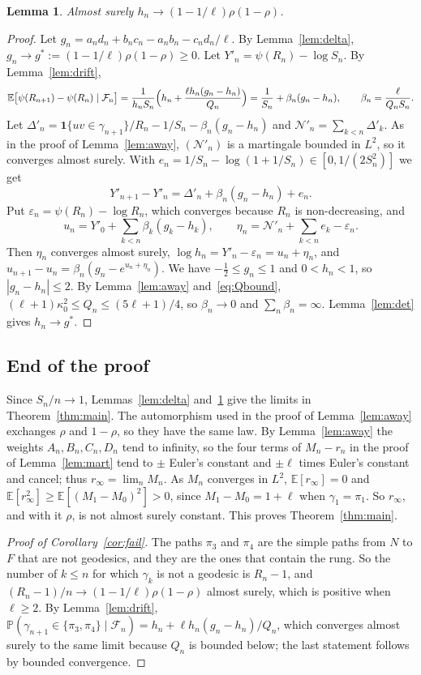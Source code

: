 \documentclass[11pt]{amsart}
\newtheorem{lemma}[theorem]{Lemma}
\theoremstyle{remark}
\newcommand{\PP}{\mathbb{P}}
\newcommand{\EE}{\mathbb{E}}
\newcommand{\cF}{\mathcal{F}}
\newcommand{\one}{\mathbf{1}}
\begin{document}
\begin{lemma}\label{lem:rung}
Almost surely $h_n\to(1-1/\ell)\rho(1-\rho)$.
\end{lemma}
\begin{proof}
Let $g_n=a_nd_n+b_nc_n-a_nb_n-c_nd_n/\ell$. By Lemma~\ref{lem:delta}, $g_n\to g^*:=(1-1/\ell)\rho(1-\rho)\ge0$.
Let $Y'_n=\psi(R_n)-\log S_n$. By Lemma~\ref{lem:drift},
\[
\EE\bigl[\psi(R_{n+1})-\psi(R_n)\mid\cF_n\bigr]=\frac{1}{h_nS_n}\Bigl(h_n+\frac{\ell h_n(g_n-h_n)}{Q_n}\Bigr)
=\frac1{S_n}+\beta_n(g_n-h_n),\qquad\beta_n=\frac{\ell}{Q_nS_n} .
\]
Let $\Delta'_n=\one\{uv\in\gamma_{n+1}\}/R_n-1/S_n-\beta_n(g_n-h_n)$ and $\mathcal N'_n=\sum_{k<n}\Delta'_k$. As in
the proof of Lemma~\ref{lem:away}, $(\mathcal N'_n)$ is a martingale bounded in $L^2$, so it converges almost surely.
With $e_n=1/S_n-\log(1+1/S_n)\in[0,1/(2S_n^2)]$ we get
\[
Y'_{n+1}-Y'_n=\Delta'_n+\beta_n(g_n-h_n)+e_n .
\]
Put $\varepsilon_n=\psi(R_n)-\log R_n$, which converges because $R_n$ is non-decreasing, and
\[
u_n=Y'_0+\sum_{k<n}\beta_k(g_k-h_k),\qquad\eta_n=\mathcal N'_n+\sum_{k<n}e_k-\varepsilon_n .
\]
Then $\eta_n$ converges almost surely, $\log h_n=Y'_n-\varepsilon_n=u_n+\eta_n$, and
$u_{n+1}-u_n=\beta_n(g_n-e^{u_n+\eta_n})$. We have $-\frac12\le g_n\le1$ and $0<h_n<1$, so $|g_n-h_n|\le2$. By
Lemma~\ref{lem:away} and~\eqref{eq:Qbound}, $(\ell+1)\kappa_0^2\le Q_n\le(5\ell+1)/4$, so $\beta_n\to0$ and
$\sum_n\beta_n=\infty$. Lemma~\ref{lem:det} gives $h_n\to g^*$.
\end{proof}

\subsection{End of the proof}
Since $S_n/n\to1$, Lemmas~\ref{lem:delta} and~\ref{lem:rung} give the limits in Theorem~\ref{thm:main}. The
automorphism used in the proof of Lemma~\ref{lem:away} exchanges $\rho$ and $1-\rho$, so they have the same law. By
Lemma~\ref{lem:away} the weights $A_n,B_n,C_n,D_n$ tend to infinity, so the four terms of $M_n-r_n$ in the proof of
Lemma~\ref{lem:mart} tend to $\pm$ Euler's constant and $\pm\ell$ times Euler's constant and cancel; thus
$r_\infty=\lim_nM_n$. As $M_n$ converges in $L^2$, $\EE[r_\infty]=0$ and
$\EE[r_\infty^2]\ge\EE[(M_1-M_0)^2]>0$, since $M_1-M_0=1+\ell$ when $\gamma_1=\pi_1$. So $r_\infty$, and with it
$\rho$, is not almost surely constant. This proves Theorem~\ref{thm:main}.

\begin{proof}[Proof of Corollary~\ref{cor:fail}]
The paths $\pi_3$ and $\pi_4$ are the simple paths from $N$ to $F$ that are not geodesics, and they are the ones that
contain the rung. So the number of $k\le n$ for which $\gamma_k$ is not a geodesic is $R_n-1$, and
$(R_n-1)/n\to(1-1/\ell)\rho(1-\rho)$ almost surely, which is positive when $\ell\ge2$. By Lemma~\ref{lem:drift},
$\PP(\gamma_{n+1}\in\{\pi_3,\pi_4\}\mid\cF_n)=h_n+\ell h_n(g_n-h_n)/Q_n$, which converges almost surely to the same
limit because $Q_n$ is bounded below; the last statement follows by bounded convergence.
\end{proof}
\end{document}
